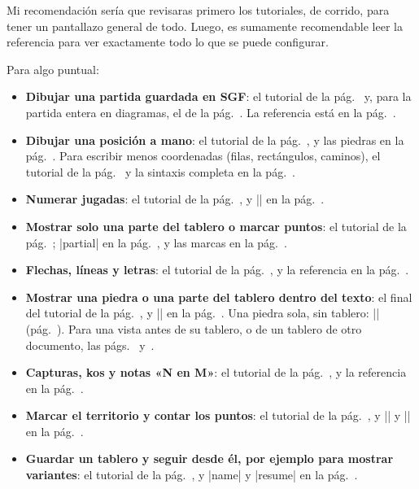 Mi recomendaci\'on ser\'ia que revisaras primero los tutoriales, de corrido, para tener un pantallazo general de todo. Luego, es sumamente recomendable leer la referencia para ver exactamente todo lo que se puede configurar.

Para algo puntual:
\begin{itemize}
	\item \textbf{Dibujar una partida guardada en SGF}: el tutorial de la pág.~\pageref{tut:primera} y, para la partida entera en diagramas, el de la pág.~\pageref{tut:partida}. La referencia está en la pág.~\pageref{subsec:sgf}.
	\item \textbf{Dibujar una posición a mano}: el tutorial de la pág.~\pageref{tut:posicion}, y las piedras en la pág.~\pageref{sec:piedras}. Para escribir menos coordenadas (filas, rectángulos, caminos), el tutorial de la pág.~\pageref{tut:abreviar} y la sintaxis completa en la pág.~\pageref{subsec:sintaxis-de-coordenadas}.
	\item \textbf{Numerar jugadas}: el tutorial de la pág.~\pageref{tut:movimientos}, y |\moves| en la pág.~\pageref{subsec:movimientos}.
	\item \textbf{Mostrar solo una parte del tablero o marcar puntos}: el tutorial de la pág.~\pageref{tut:parcial}; |partial| en la pág.~\pageref{subsec:parcial}, y las marcas en la pág.~\pageref{sec:marcas}.
	\item \textbf{Flechas, líneas y letras}: el tutorial de la pág.~\pageref{tut:pelea}, y la referencia en la pág.~\pageref{subsec:flechas}.
	\item \textbf{Mostrar una piedra o una parte del tablero dentro del texto}: el final del tutorial de la pág.~\pageref{tut:pelea}, y |\pgfgoview| en la pág.~\pageref{subsec:vistas}. Una piedra sola, sin tablero: |\pgfgostone| (pág.~\pageref{subsec:piedra-texto}). Para una vista antes de su tablero, o de un tablero de otro documento, las págs.~\pageref{subsec:vistas-antes} y~\pageref{subsec:exportar}.
	\item \textbf{Capturas, kos y notas «N en M»}: el tutorial de la pág.~\pageref{tut:ko}, y la referencia en la pág.~\pageref{sec:juego}.
	\item \textbf{Marcar el territorio y contar los puntos}: el tutorial de la pág.~\pageref{tut:territorio}, y |\territory| y |\pgfgoscore| en la pág.~\pageref{subsec:territorio}.
	\item \textbf{Guardar un tablero y seguir desde él, por ejemplo para mostrar variantes}: el tutorial de la pág.~\pageref{tut:variantes}, y |name| y |resume| en la pág.~\pageref{subsec:recordar}.

\end{itemize}
